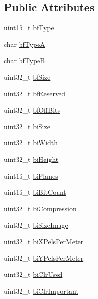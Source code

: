 \subsection*{Public Attributes}
\begin{DoxyCompactItemize}
\item 
uint16\+\_\+t \mbox{\hyperlink{structHeader_a9d40c794c46d671f006974632a24834d}{bf\+Type}}
\item 
char \mbox{\hyperlink{structHeader_a470bee676e10a55f7f65c04aa18d34c8}{bf\+TypeA}}
\item 
char \mbox{\hyperlink{structHeader_a9a949e94cf003232940b7d9b10b5c263}{bf\+TypeB}}
\item 
uint32\+\_\+t \mbox{\hyperlink{structHeader_a898252c4f5d633e46944b37ba145fca5}{bf\+Size}}
\item 
uint32\+\_\+t \mbox{\hyperlink{structHeader_a71d1ea38530c52d3bf8b278e673a9541}{bf\+Reserved}}
\item 
uint32\+\_\+t \mbox{\hyperlink{structHeader_a14ebd86ca12bd051ade0831f6dade02d}{bf\+Off\+Bits}}
\item 
uint32\+\_\+t \mbox{\hyperlink{structHeader_ad0177b2629281c20f349c0fa05d6871c}{bi\+Size}}
\item 
uint32\+\_\+t \mbox{\hyperlink{structHeader_afb7f08c913da5d5a09af9ee77a2a03fb}{bi\+Width}}
\item 
uint32\+\_\+t \mbox{\hyperlink{structHeader_a3b4e976dbf78cd5a03e37b6a42577dcd}{bi\+Height}}
\item 
uint16\+\_\+t \mbox{\hyperlink{structHeader_ad6438b98bf17f799cc9cd1285da92426}{bi\+Planes}}
\item 
uint16\+\_\+t \mbox{\hyperlink{structHeader_a4e5d3f9ede3980246fe21698bd838158}{bi\+Bit\+Count}}
\item 
uint32\+\_\+t \mbox{\hyperlink{structHeader_a18f90bd3b3aac03aadb4bfe9072795bd}{bi\+Compression}}
\item 
uint32\+\_\+t \mbox{\hyperlink{structHeader_a714d9d2941682d1b7ab0349dd2b7530f}{bi\+Size\+Image}}
\item 
uint32\+\_\+t \mbox{\hyperlink{structHeader_a63bb062f64b78846caf8399979a304ba}{bi\+X\+Pels\+Per\+Meter}}
\item 
uint32\+\_\+t \mbox{\hyperlink{structHeader_a2b3d87badc7563830106736beed76402}{bi\+Y\+Pels\+Per\+Meter}}
\item 
uint32\+\_\+t \mbox{\hyperlink{structHeader_a1d847ba2e7caf89429c1fffdc54be1ea}{bi\+Clr\+Used}}
\item 
uint32\+\_\+t \mbox{\hyperlink{structHeader_a935b0e4f146a944af7243154f99cbc99}{bi\+Clr\+Important}}
\end{DoxyCompactItemize}


